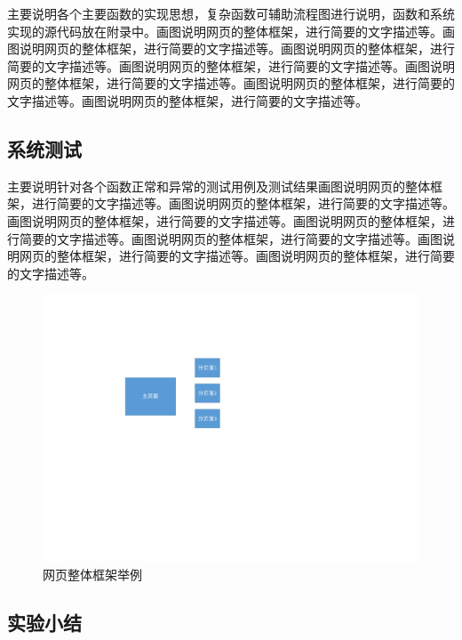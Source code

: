 \documentclass[supercite]{Experimental_Report}
\theoremstyle{definition}
\begin{document}
主要说明各个主要函数的实现思想，复杂函数可辅助流程图进行说明，函数和系统实现的源代码放在附录中。画图说明网页的整体框架，进行简要的文字描述等。画图说明网页的整体框架，进行简要的文字描述等。画图说明网页的整体框架，进行简要的文字描述等。画图说明网页的整体框架，进行简要的文字描述等。画图说明网页的整体框架，进行简要的文字描述等。画图说明网页的整体框架，进行简要的文字描述等。画图说明网页的整体框架，进行简要的文字描述等。

\subsection{系统测试}

主要说明针对各个函数正常和异常的测试用例及测试结果画图说明网页的整体框架，进行简要的文字描述等。画图说明网页的整体框架，进行简要的文字描述等。画图说明网页的整体框架，进行简要的文字描述等。画图说明网页的整体框架，进行简要的文字描述等。画图说明网页的整体框架，进行简要的文字描述等。画图说明网页的整体框架，进行简要的文字描述等。画图说明网页的整体框架，进行简要的文字描述等。

\begin{figure}[htb] %
	\begin{center}
		\includegraphics[scale=0.80]{images/1-1.pdf}
		\caption{网页整体框架举例}
		\label{fig5-1}
	\end{center}
\end{figure}

\subsection{实验小结}

\newpage
\end{document}
